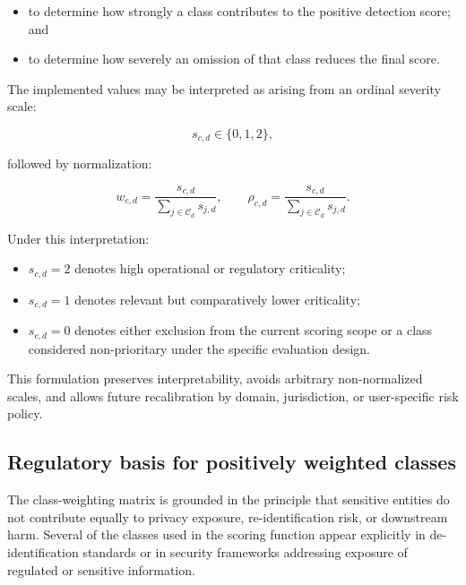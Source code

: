\documentclass[11pt,a4paper]{article}
\begin{document}
\begin{itemize}
    \item to determine how strongly a class contributes to the positive detection score; and
    \item to determine how severely an omission of that class reduces the final score.
\end{itemize}

The implemented values may be interpreted as arising from an ordinal severity scale:

\begin{equation}
    s_{c,d}\in\{0,1,2\},
\end{equation}

followed by normalization:

\begin{equation}
    w_{c,d}=
    \frac{s_{c,d}}{\sum_{j\in\mathcal{C}_d}s_{j,d}},
    \qquad
    \rho_{c,d}=
    \frac{s_{c,d}}{\sum_{j\in\mathcal{C}_d}s_{j,d}}.
\end{equation}

Under this interpretation:

\begin{itemize}
    \item \(s_{c,d}=2\) denotes high operational or regulatory criticality;
    \item \(s_{c,d}=1\) denotes relevant but comparatively lower criticality;
    \item \(s_{c,d}=0\) denotes either exclusion from the current scoring scope or a class considered non-prioritary under the specific evaluation design.
\end{itemize}

This formulation preserves interpretability, avoids arbitrary non-normalized scales, and allows future recalibration by domain, jurisdiction, or user-specific risk policy.

\subsection{Regulatory basis for positively weighted classes}

The class-weighting matrix is grounded in the principle that sensitive entities do not contribute equally to privacy exposure, re-identification risk, or downstream harm. Several of the classes used in the scoring function appear explicitly in de-identification standards or in security frameworks addressing exposure of regulated or sensitive information.
\end{document}
